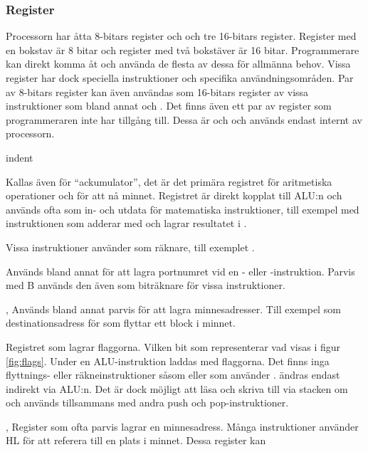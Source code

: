 \documentclass[main.tex]{subfiles}
\begin{document}
\subsubsection{Register}
    Processorn har åtta 8-bitars register och och tre 16-bitars register.
    Register med en bokstav är 8 bitar och register med två bokstäver är 16
    bitar. Programmerare kan direkt komma åt och använda de flesta av dessa för
    allmänna behov. Vissa register har dock speciella instruktioner och
    specifika användningsområden. Par av 8-bitars register kan även användas
    som 16-bitars register av vissa instruktioner som bland annat  och . Det finns även ett par av register som
    programmeraren inte har tillgång till. Dessa är  och  och
    används endast internt av processorn.
\begin{labeling}{indent}
\item[\mono{A}]
    Kallas även för ``ackumulator'', det är det primära registret för
    aritmetiska operationer och för att nå minnet. Registret är direkt kopplat
    till ALU:n och används ofta som in- och utdata för matematiska
    instruktioner, till exempel med instruktionen  som
    adderar  med  och lagrar resultatet i .
\item[\mono{B}]
    Vissa instruktioner använder  som räknare, till exemplet
    .
\item[\mono{C}]
    Används bland annat för att lagra portnumret vid en - eller
    -instruktion. Parvis med B används den även som biträknare för
    vissa instruktioner.
\item[\mono{D}, \mono{E}]
    Används bland annat parvis för att lagra minnesadresser. Till exempel som
    destinationsadress för  som flyttar ett block i minnet.
\item[\mono{F}]
    Registret som lagrar flaggorna. Vilken bit som representerar vad visas i
    figur \ref{fig:flags}. Under en ALU-instruktion laddas  med
    flaggorna. Det finns inga flyttnings- eller räkneinstruktioner såsom
     eller  som använder .  ändras endast
    indirekt via ALU:n. Det är dock möjligt att läsa och skriva till 
    via stacken om  och  används tillsammans med
    andra push och pop-instruktioner.
\item[\mono{H}, \mono{L}]
    Register som ofta parvis lagrar en minnesadress. Många instruktioner
    använder HL för att referera till en plats i minnet. Dessa register kan

\end{labeling}
\end{document}
